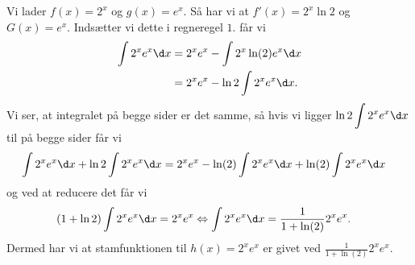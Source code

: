 \begin{enumerate}
Vi lader $f(x)=2^x$ og $g(x)=e^x$. Så har vi at $f'(x)=2^x\ln 2$ og $G(x)=e^x$. Indsætter vi dette i regneregel $1.$ får vi
\begin{align*}
\int 2^x e^x \d x &= 2^x e^x - \int 2^x\ln (2) e^x \d x \\
&=2^x e^x - \ln 2 \int 2^xe^x \d x.
\end{align*}
Vi ser, at integralet på begge sider er det samme, så hvis vi ligger $\displaystyle \ln 2 \int 2^xe^x \d x$ til på begge sider får vi
\begin{align*}
\int 2^x e^x \d x + \ln 2\int 2^xe^x \d x &=2^x e^x - \ln(2)\int 2^xe^x \d x + \ln(2)\int 2^xe^x \d x
\end{align*}
og ved at reducere det får vi
\begin{align*}
(1 + \ln 2)\int 2^xe^x \d x &=2^x e^x \Leftrightarrow \int 2^x e^x \d x = \frac{1}{1+\ln(2)}2^xe^x.
\end{align*}
Dermed har vi at stamfunktionen til $h(x)=2^xe^x$ er givet ved $\displaystyle \frac{1}{1+\ln(2)}2^xe^x$.
\end{enumerate}




